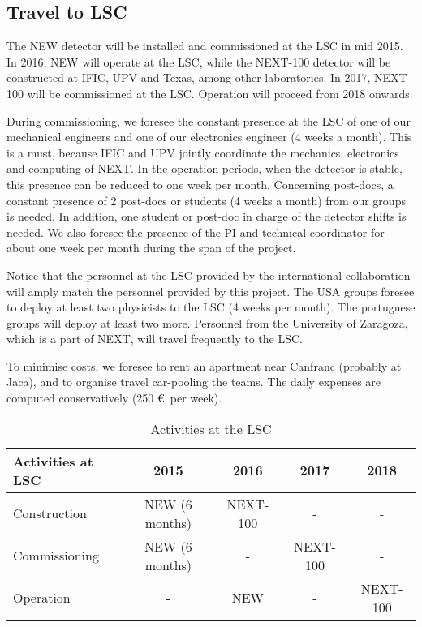 \subsection{Travel to LSC}
The NEW detector will be installed and commissioned at the LSC in mid 2015. In 2016, NEW will operate at the LSC, while the NEXT-100 detector will be constructed at IFIC, UPV and Texas, among other laboratories. In 2017, NEXT-100 will be commissioned at the LSC. Operation will proceed from 2018 onwards.

During commissioning, we foresee the constant presence at the LSC of one of our mechanical engineers and one of our electronics engineer (4 weeks a month).  This is a must, because IFIC and UPV jointly coordinate the mechanics, electronics and computing of NEXT. In the operation periods, when the detector is stable, this presence can be reduced to one week per month. Concerning post-docs, a constant presence of 2 post-docs or students (4 weeks a month) from our groups is needed. In addition, one student or post-doc in charge of the detector shifts is needed. We also foresee the presence of the PI and technical coordinator for about one week per month during the span of the project. 

Notice that the personnel at the LSC provided by the international collaboration will amply match the personnel provided by this project. The USA groups foresee to deploy at least two physicists to the LSC (4 weeks per month). The portuguese groups will deploy at least two more. Personnel from the University of Zaragoza, which is a part of NEXT, will travel frequently to the LSC. 

To minimise costs, we foresee to rent an apartment near Canfranc (probably at Jaca), and to organise travel car-pooling the teams. The daily expenses are computed conservatively (250 \euro\ per week). 

\begin{table}[h!]
\begin{center}
\begin{tabular}{|l|c|c|c|c|}
\hline
Activities at LSC &	2015 &	2016 &	2017 &	2018\\
 \hline	
Construction &	NEW (6 months) &	NEXT-100 & - & - \\ 		
Commissioning	&NEW (6 months) &	- & NEXT-100 & - \\	
Operation	&	- &  NEW & - & NEXT-100 \\ 	
\hline\hline	
\end{tabular}  
\caption{Activities at the LSC}
\label{tab.ActivitiesLSC}
\end{center}
\end{table}
 
